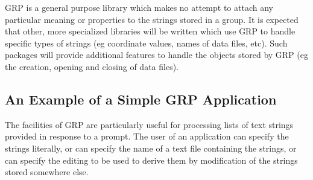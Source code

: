 GRP is a general purpose library which makes no attempt to
attach any particular meaning or properties to the strings stored in a group.
It is expected that other, more specialized libraries will be written
which use GRP to handle specific types of strings (eg coordinate values, names
of data files, etc). Such packages will provide additional features to handle
the objects stored by GRP (eg the creation, opening and closing of data files).

\subsection{\label{SEC:EXAMC}An Example of a Simple GRP Application}
The facilities of GRP are particularly useful for processing lists of text
strings provided in response to a prompt. The user of an application can specify
the strings literally, or can specify the name of a text file containing the
strings, or can specify the editing to be used to derive them by modification of
the strings stored somewhere else.


